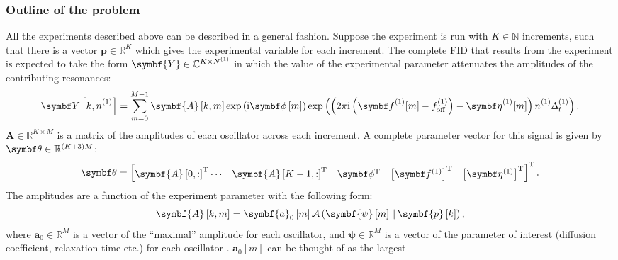 
\subsubsection{Outline of the problem}
All the experiments described above can be described in a general fashion.
Suppose the experiment is run with $K \in \mathbb{N}$ increments, such that there is a
vector  $\symbf{p} \in \mathbb{R}^K$ which gives the experimental variable for
each increment.
The complete \ac{FID} that results from the experiment is expected to take the
form $\symbf{Y} \in \mathbb{C}^{K \times \None}$ in which the value of the
experimental parameter attenuates the amplitudes of the contributing
resonances:
\begin{equation}
    \bY\left[k, \none\right] = \sum_{m=0}^{M-1} \symbf{A}\left[k, m\right]  \exp\left(\iu \bdphim \right)
    \exp\left(\left(2 \pi \iu \left(\bdfone_{\vphantom{\text{off}}} [m] -
    \foffone\right) - \bdetaone_{\vphantom{\text{off}}} [m] \right) \none
\Dtone\right).
\end{equation}
$\symbf{A} \in \mathbb{R}^{K \times M}$ is a matrix of the amplitudes of
each oscillator across each increment. A complete parameter vector for this
signal is given by $\bth \in \mathbb{R}^{(K + 3)M}$:
\begin{equation}
    \bth =
    \begin{bmatrix}
        \symbf{A}\left[0, :\right]\T \cdots & \symbf{A}\left[K-1, :\right]\T &
        \bdphi\T & \left[\bdfone\right]\T & \left[\bdetaone\right]\T
    \end{bmatrix}\T.
\end{equation}
The amplitudes are a function of the experiment parameter with the following
form:
\begin{equation}
    \symbf{A}\left[k, m\right] =
        \symbf{a}_0 \left[m\right]
        \mathcal{A} \left(
            \symbf{\psi}\left[m\right] \hspace*{2pt} | \hspace*{2pt}
            \symbf{p}\left[k\right]
        \right),
\end{equation}
where $\symbf{a}_0 \in \mathbb{R}^{M}$ is a vector of the ``maximal''
amplitude for each oscillator, and $\symbf{\psi} \in \mathbb{R}^M$ is a vector
of the parameter of interest (diffusion coefficient, relaxation time etc.) for
each oscillator . $\symbf{a}_0 [m]$ can be thought of as the largest
